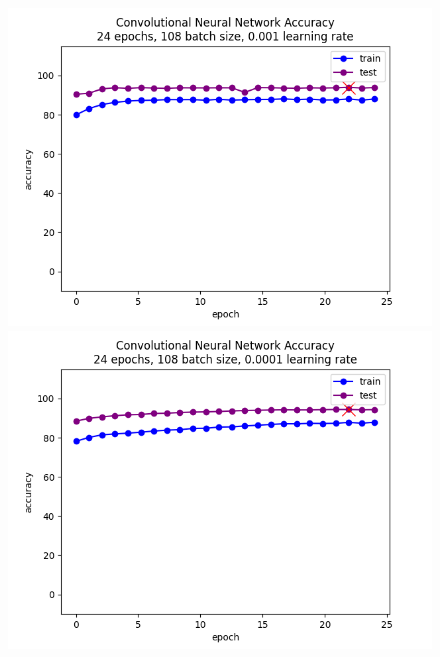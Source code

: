 \documentclass[10pt,twocolumn,letterpaper]{article}
\begin{document}
\begin{figure}[h]
   \begin{center}
       \includegraphics[scale=0.8]{graphs/CNN/higher_learning_rate_accuracies_plot.png}
        \includegraphics[scale=0.8]{graphs/CNN/accuracies_plot.png}
   \end{center}
        \vspace*{-5mm}
        \caption{\label{seventh_figure}}
\end{figure}
\end{document}
